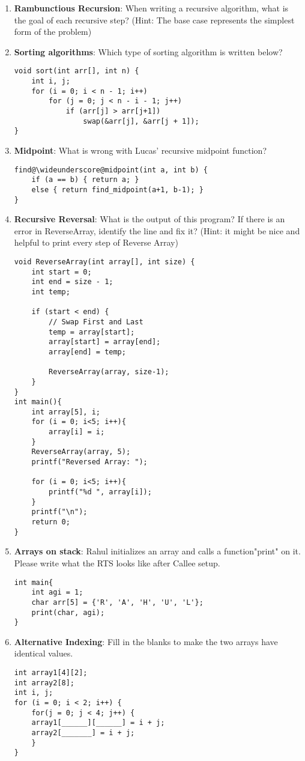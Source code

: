 \documentclass{article}
\begin{document}
\begin{enumerate}[label=(\alph*), itemsep = 120pt]
\newpage
\item \textbf{Rambunctious Recursion}: When writing a recursive algorithm, what is the goal of each recursive step? (Hint: The base case represents the simplest form of the problem)

  \item \textbf{Sorting algorithms}: Which type of sorting algorithm is written below?
\begin{lstlisting}[style=CStyle]
void sort(int arr[], int n) {
    int i, j;
    for (i = 0; i < n - 1; i++)
        for (j = 0; j < n - i - 1; j++)
            if (arr[j] > arr[j+1])
                swap(&arr[j], &arr[j + 1]);
}\end{lstlisting}

        \item \textbf{Midpoint}: What is wrong with Lucas' recursive midpoint function?
        
\begin{lstlisting}[style=CStyle] 
find@\wideunderscore@midpoint(int a, int b) {
    if (a == b) { return a; }
    else { return find_midpoint(a+1, b-1); }
}\end{lstlisting}

    \newpage
    \item \textbf{Recursive Reversal}: What is the output of this program? If there is an error in ReverseArray, identify the line and fix it? (Hint: it might be nice and helpful to print every step of Reverse Array)

\begin{lstlisting}[style=CStyle] 
void ReverseArray(int array[], int size) {
    int start = 0;
    int end = size - 1;
    int temp;
    
    if (start < end) {
        // Swap First and Last
        temp = array[start];
        array[start] = array[end];
        array[end] = temp;
        
        ReverseArray(array, size-1);
    }
}
int main(){
    int array[5], i;
    for (i = 0; i<5; i++){
        array[i] = i;
    }
    ReverseArray(array, 5);
    printf("Reversed Array: ");

    for (i = 0; i<5; i++){
        printf("%d ", array[i]);
    }
    printf("\n");
    return 0;
}\end{lstlisting}

\item \textbf{Arrays on stack}: Rahul initializes an array and calls a function"print" on it. Please write what the RTS looks like after Callee setup.
\begin{lstlisting}[style=CStyle] 
int main{
    int agi = 1;
    char arr[5] = {'R', 'A', 'H', 'U', 'L'};
    print(char, agi);
}
\end{lstlisting}
\newpage
\item \textbf{Alternative Indexing}: Fill in the blanks to make the two arrays have identical values.
\begin{lstlisting}[style=CStyle] 
int array1[4][2];
int array2[8];
int i, j;
for (i = 0; i < 2; i++) {
    for(j = 0; j < 4; j++) {
    array1[______][______] = i + j;
    array2[_______] = i + j;
    }
}
\end{lstlisting}
\end{enumerate}
\newpage
\end{document}
